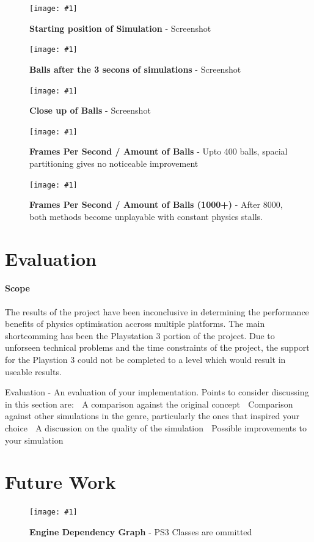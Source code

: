 \documentclass[conference]{acmsiggraph}
\newcommand{\figuremacroW}[4]{
	\begin{figure}[h] %
		\centering
		\texttt{[image: \#1]}
		\caption[#2]{\textbf{#2} - #3}
		\label{fig:#1}
	\end{figure}
}
\newcommand{\figuremacroF}[4]{
	\begin{figure}[h] %
		\centering
		\texttt{[image: \#1]}
		\caption[#2]{\textbf{#2} - #3}
		\label{fig:#1}
	\end{figure}
}
\begin{document}
\figuremacroW
{screenshot3}
{Starting position of Simulation}
{Screenshot}
{1.0}

\figuremacroW
{screenshot4}
{Balls after the 3 secons of simulations}
{Screenshot}
{1.0}

\figuremacroW
{screenshot5}
{Close up of Balls}
{Screenshot}
{1.0}


\figuremacroF
{chart1-a}
{Frames Per Second / Amount of Balls}
{Upto 400 balls, spacial partitioning gives no noticeable improvement}
{1.0}

\figuremacroF
{chart1-b}
{Frames Per Second / Amount of Balls (1000+)}
{After 8000, both methods become unplayable with constant physics stalls.}
{1.0}

\section{Evaluation}

\paragraph{Scope}
The results of the project have been inconclusive in determining the performance benefits of physics optimisation accross multiple platforms. The main shortcomming has been the Playstation 3 portion of the project. Due to unforseen technical problems and the time constraints of the project, the support for the Playstion 3 could not be completed to a level which would result in useable results.



Evaluation - An evaluation of your implementation. Points to consider discussing in this
section are:
 A comparison against the original concept
 Comparison against other simulations in the genre, particularly the ones that
inspired your choice
 A discussion on the quality of the simulation
 Possible improvements to your simulation

\section{Future Work}







\figuremacroF
{engineclasses}
{Engine Dependency Graph}
{PS3 Classes are ommitted}
{1.0}
\end{document}
